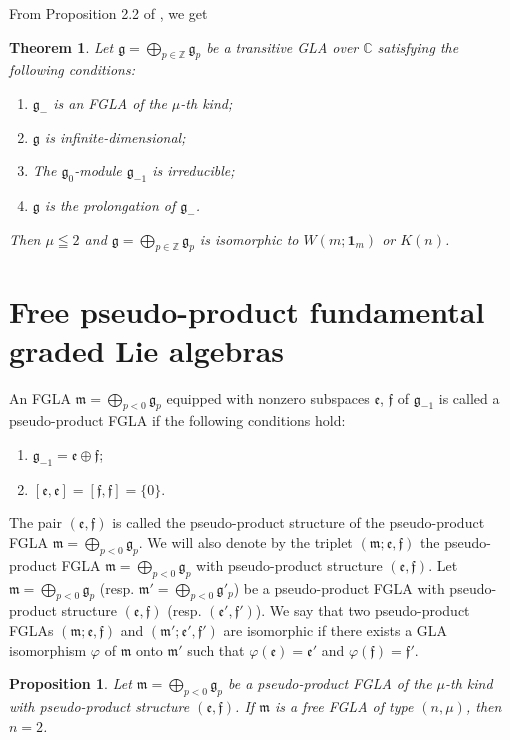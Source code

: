 \documentclass[11pt]{article}
\newtheorem{theorem}{Theorem}
\newtheorem{proposition}{Proposition}
\numberwithin{equation}{section}
\numberwithin{theorem}{section}
\numberwithin{proposition}{section}
\numberwithin{lemma}{section}
\numberwithin{corollary}{section}
\numberwithin{definition}{section}
\numberwithin{example}{section}
\numberwithin{remark}{section}
\numberwithin{note}{section}
\newcommand{\gla}[1]{\mathfrak#1=\bigoplus\limits_{p\in\mathbb Z}\mathfrak#1_p} \renewcommand{\labelenumi}{{\rm (\arabic{enumi})}}
\newcounter{theoremI}
\begin{document}
From Proposition 2.2 of \cite{mt70:1}, we get
\begin{theorem}\label{thm6.1} Let $\gla g$ be a transitive GLA over $\mathbb C$
satisfying the following conditions:
\begin{enumerate}\itemsep=0pt
\renewcommand{\labelenumi}{$(\roman{enumi})$}
\item $\mathfrak g_-$ is an FGLA of the
$\mu$-th kind;
\item $\mathfrak g$ is infinite-dimensional;
\item The $\mathfrak g_0$-module $\mathfrak g_{-1}$ is irreducible;
\item $\mathfrak g$ is the prolongation of $\mathfrak g_-$.
\end{enumerate}
Then $\mu\leqq2$ and $\gla g$ is isomorphic to $W(m;{\bm 1}_m)$ or $K(n)$.
\end{theorem}
\setcounter{section}{7}
\setcounter{subsection}{0}
\setcounter{subsubsection}{0}
\setcounter{theoremI}{2}
\setcounter{equation}{0}
\section{Free pseudo-product fundamental graded Lie algebras}\label{section8}

An FGLA $\mathfrak m=\bigoplus\limits_{p<0}\mathfrak g_p$ equipped with
nonzero subspaces $\mathfrak e$, $\mathfrak f$ of $\mathfrak g_{-1}$ is called
a pseudo-product FGLA if the following conditions hold:
\begin{enumerate}\itemsep=0pt
\renewcommand{\labelenumi}{$(\roman{enumi})$}
\item $\mathfrak g_{-1}=\mathfrak e\oplus\mathfrak f$;
\item $[\mathfrak e,\mathfrak e]=[\mathfrak f,\mathfrak f]=\{0\}$.
\end{enumerate}
The pair $(\mathfrak e,\mathfrak f)$ is called the pseudo-product structure of
the pseudo-product FGLA
$\mathfrak m=\bigoplus\limits_{p<0}\mathfrak g_p$.
We will also denote by the triplet $(\mathfrak m;\mathfrak e,\mathfrak f)$
the pseudo-product FGLA $\mathfrak m=\bigoplus\limits_{p<0}\mathfrak g_p$
with pseudo-product structure $(\mathfrak e,\mathfrak f)$.
Let $\mathfrak m=\bigoplus\limits_{p<0}\mathfrak g_p$ (resp.
$\mathfrak m'=\bigoplus\limits_{p<0}\mathfrak g'_p$) be a
pseudo-product FGLA with pseudo-product structure $(\mathfrak e,\mathfrak f)$
(resp. $(\mathfrak e',\mathfrak f')$).
We say that two pseudo-product FGLAs $(\mathfrak m;\mathfrak e,\mathfrak f)$
and $(\mathfrak m';\mathfrak e',\mathfrak f')$
are isomorphic if there exists a GLA isomorphism
$\varphi$ of $\mathfrak m$ onto $\mathfrak m'$ such that
$\varphi(\mathfrak e)=\mathfrak e'$ and $\varphi(\mathfrak f)=\mathfrak f'$.
\begin{proposition}\label{prop8.1} Let $\mathfrak m=\bigoplus\limits_{p<0}\mathfrak g_p$ be a
pseudo-product FGLA of the $\mu$-th kind with pseudo-product
structure $(\mathfrak e,\mathfrak f)$.
If $\mathfrak m$ is a free FGLA of type $(n,\mu)$,
then $n=2$.
\end{proposition}
\end{document}

